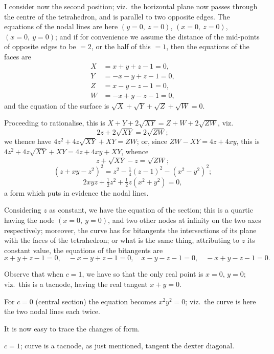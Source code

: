 \documentclass[12pt,a4paper]{article}
\theoremstyle{plain}
\theoremstyle{definition}
\begin{document}
\newpage
\setcounter{page}{7}

I consider now the second position; viz.\ the horizontal plane now passes through the centre of the tetrahedron, and is parallel to two opposite edges. The equations of the nodal lines are here $(y = 0,\ z = 0)$, $(x = 0,\ z = 0)$, $(x = 0,\ y = 0)$; and if for convenience we assume the distance of the mid-points of opposite edges to be $= 2$, or the half of this $= 1$, then the equations of the faces are
\begin{align*}
X &= x + y + z - 1 = 0,\\
Y &= -x - y + z - 1 = 0,\\
Z &= x - y - z - 1 = 0,\\
W &= -x + y - z - 1 = 0,
\end{align*}
and the equation of the surface is $\sqrt{X} + \sqrt{Y} + \sqrt{Z} + \sqrt{W} = 0$.

Proceeding to rationalise, this is $X + Y + 2\sqrt{XY} = Z + W + 2\sqrt{ZW}$, viz.
\[
2z + 2\sqrt{XY} = 2\sqrt{ZW};
\]
we thence have $4z^2 + 4z\sqrt{XY} + XY = ZW$; or, since $ZW - XY = 4z + 4xy$, this is $4z^2 + 4z\sqrt{XY} + XY = 4z + 4xy + XY$, whence
\[
z + \sqrt{XY} - z = \sqrt{ZW};
\]
\[
(z + xy - z^2)^2 = z^2 - \tfrac{1}{4}(z - 1)^2 - (x^2 - y^2)^2;
\]
\[
2xyz + \tfrac{1}{2}z^2 + \tfrac{1}{2}z(x^2 + y^2) = 0,
\]
a form which puts in evidence the nodal lines.

Considering $z$ as constant, we have the equation of the section; this is a quartic having the node $(x = 0,\ y = 0)$, and two other nodes at infinity on the two axes respectively; moreover, the curve has for bitangents the intersections of its plane with the faces of the tetrahedron; or what is the same thing, attributing to $z$ its constant value, the equations of the bitangents are
\[
x + y + z - 1 = 0,\quad -x - y + z - 1 = 0,\quad x - y - z - 1 = 0,\quad -x + y - z - 1 = 0.
\]

\newpage
\setcounter{page}{8}

Observe that when $c = 1$, we have so that the only real point is $x = 0$, $y = 0$; viz.\ this is a tacnode, having the real tangent $x + y = 0$.

For $c = 0$ (central section) the equation becomes $x^2y^2 = 0$; viz.\ the curve is here the two nodal lines each twice.

It is now easy to trace the changes of form.

\smallskip

$c = 1$; curve is a tacnode, as just mentioned, tangent the dexter diagonal.
\end{document}
